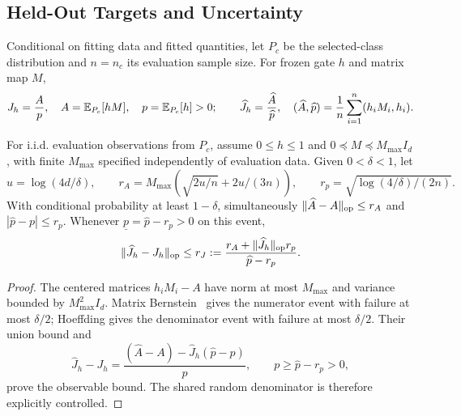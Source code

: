 \subsection{Held-Out Targets and Uncertainty}
\label{app:heldout-ratio}
Conditional on fitting data and fitted quantities, let $P_c$ be the selected-class distribution and $n=n_c$ its evaluation sample size. For frozen gate $h$ and matrix map $M$,
\begin{equation}
J_h=\frac{A}{p},\quad A=\mathbb{E}_{P_c}[hM],\quad p=\mathbb{E}_{P_c}[h]>0;
\qquad \widehat J_h=\frac{\widehat A}{\widehat p},\quad
(\widehat A,\widehat p)=\frac1n\sum_{i=1}^n(h_iM_i,h_i).
\label{eq:hidden-slice-population-target}
\end{equation}
\begin{appendixproposition}
\label{prop:frozen-gate-ratio}
For i.i.d. evaluation observations from $P_c$, assume $0\le h\le1$ and $0\preceq M\preceq M_{\max}I_d$, with finite $M_{\max}$ specified independently of evaluation data. Given $0<\delta<1$, let
\[
u=\log(4d/\delta),\qquad
r_A=M_{\max}\left(\sqrt{2u/n}+2u/(3n)\right),\qquad
r_p=\sqrt{\log(4/\delta)/(2n)}.
\]
With conditional probability at least $1-\delta$, simultaneously $\lVert\widehat A-A\rVert_{\mathrm{op}}\le r_A$ and $|\widehat p-p|\le r_p$. Whenever $\underline p=\widehat p-r_p>0$ on this event,
\begin{equation}
\lVert\widehat J_h-J_h\rVert_{\mathrm{op}}
\le r_J:=\frac{r_A+\lVert\widehat J_h\rVert_{\mathrm{op}}r_p}{\widehat p-r_p}.
\label{eq:frozen-gate-ratio-radius}
\end{equation}
\end{appendixproposition}
\begin{proof}
The centered matrices $h_iM_i-A$ have norm at most $M_{\max}$ and variance bounded by $M_{\max}^2I_d$. Matrix Bernstein~\citep[Theorem~1.4]{tropp2012user} gives the numerator event with failure at most $\delta/2$; Hoeffding gives the denominator event with failure at most $\delta/2$. Their union bound and
\[
\widehat J_h-J_h=
\frac{(\widehat A-A)-\widehat J_h(\widehat p-p)}{p},
\qquad p\ge\widehat p-r_p>0,
\]
prove the observable bound. The shared random denominator is therefore explicitly controlled.
\end{proof}


